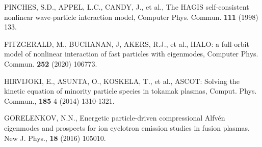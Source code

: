 \documentclass[10pt, a4paper, twoside]{article}
\begin{document}
\begin{thebibliography}{9}
    PINCHES, S.D., APPEL, L.C., CANDY, J., et al.,
    The HAGIS self-consistent nonlinear wave-particle interaction model,
    Computer Phys. Commun.
    \textbf{111}
    (1998)
    133.

    FITZGERALD, M., BUCHANAN, J, AKERS, R.J., et al.,
    HALO: a full-orbit model of nonlinear interaction of fast particles with eigenmodes,
    Computer Phys. Commun.
    \textbf{252}
    (2020)
    106773.

    HIRVIJOKI, E., ASUNTA, O., KOSKELA, T., et al.,
    ASCOT: Solving the kinetic equation of minority particle species in tokamak plasmas,
    Comput. Phys. Commun.,
    \textbf{185} 4 
    (2014) 
    1310-1321.

    GORELENKOV, N.N.,
    Energetic particle-driven compressional Alfv\'en eigenmodes and prospects for ion cyclotron emission studies in fusion plasmas,
    New J. Phys.,
    \textbf{18}
    (2016) 
    105010.

\end{thebibliography}
\end{document}
